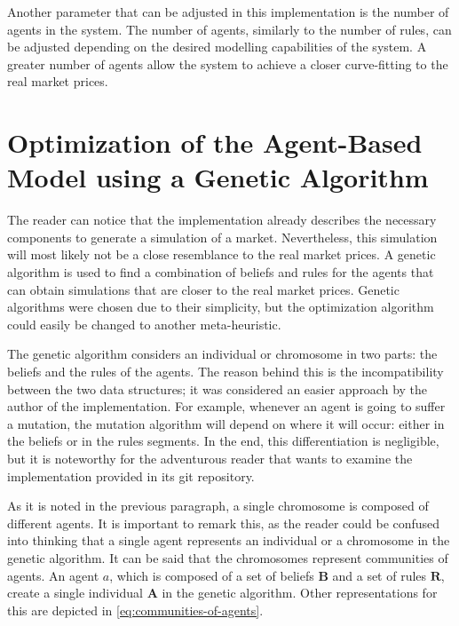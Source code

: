 Another parameter that can be adjusted in this implementation is the number of
agents in the system. The number of agents, similarly to the number of rules,
can be adjusted depending on the desired modelling capabilities of the system. A
greater number of agents allow the system to achieve a closer curve-fitting to
the real market prices.

\section{Optimization of the Agent-Based Model using a Genetic Algorithm}
\label{section:optimization-of-the-agent-based-model-using-a-genetic-algorithm}

The reader can notice that the implementation already describes 
the necessary components to generate a simulation of a
market. Nevertheless, this simulation will most likely not be a close
resemblance to the real market prices. A genetic algorithm is used to find a
combination of beliefs and rules for the agents that can obtain simulations that
are closer to the real market prices. Genetic algorithms were chosen due to
their simplicity, but the optimization algorithm could easily be changed to
another meta-heuristic.  %

The genetic algorithm considers an individual or chromosome in two parts: the
beliefs and the rules of the agents. The reason behind this is the
incompatibility between the two data structures; it was considered an easier
approach by the author of the implementation. For example, whenever an agent is
going to suffer a mutation, the mutation algorithm will depend on where it will
occur: either in the beliefs or in the rules segments. In the end, this
differentiation is negligible, but it is noteworthy for the adventurous reader
that wants to examine the implementation provided in its git repository.

As it is noted in the previous paragraph, a single chromosome is composed of
different agents. It is important to remark this, as the reader could be
confused into thinking that a single agent represents an individual or a
chromosome in the genetic algorithm. It can be said that the chromosomes
represent communities of agents. An agent $a$, which is composed
of a set of beliefs $\bm{B}$ and a set of rules $\bm{R}$, create a single
individual $\bm{A}$ in the genetic algorithm. Other representations for this are
depicted in \ref{eq:communities-of-agents}.

